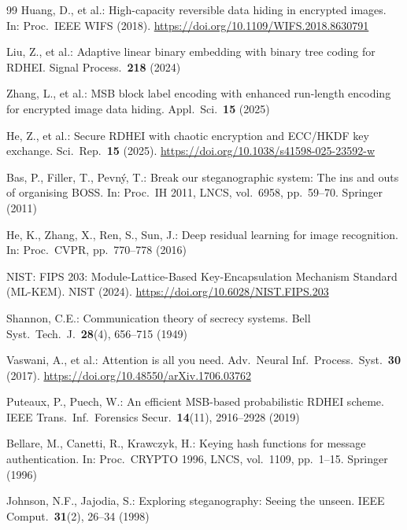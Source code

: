 \documentclass[runningheads]{llncs}
\begin{document}
\begin{thebibliography}{99}
Huang, D., et al.: High-capacity reversible data hiding in
encrypted images. In: Proc.\ IEEE WIFS (2018).
\url{https://doi.org/10.1109/WIFS.2018.8630791}

Liu, Z., et al.: Adaptive linear binary embedding with binary
tree coding for RDHEI. Signal Process.\ \textbf{218} (2024)

Zhang, L., et al.: MSB block label encoding with enhanced
run-length encoding for encrypted image data hiding.
Appl.\ Sci.\ \textbf{15} (2025)

He, Z., et al.: Secure RDHEI with chaotic encryption and
ECC/HKDF key exchange. Sci.\ Rep.\ \textbf{15} (2025).
\url{https://doi.org/10.1038/s41598-025-23592-w}

Bas, P., Filler, T., Pevn\'y, T.: Break our steganographic
system: The ins and outs of organising BOSS. In: Proc.\
IH 2011, LNCS, vol.\ 6958, pp.\ 59--70. Springer (2011)

He, K., Zhang, X., Ren, S., Sun, J.: Deep residual learning
for image recognition. In: Proc.\ CVPR, pp.\ 770--778 (2016)

NIST: FIPS 203: Module-Lattice-Based Key-Encapsulation
Mechanism Standard (ML-KEM). NIST (2024).
\url{https://doi.org/10.6028/NIST.FIPS.203}

Shannon, C.E.: Communication theory of secrecy systems.
Bell Syst.\ Tech.\ J.\ \textbf{28}(4), 656--715 (1949)

Vaswani, A., et al.: Attention is all you need.
Adv.\ Neural Inf.\ Process.\ Syst.\ \textbf{30} (2017).
\url{https://doi.org/10.48550/arXiv.1706.03762}

Puteaux, P., Puech, W.: An efficient MSB-based probabilistic
RDHEI scheme. IEEE Trans.\ Inf.\ Forensics Secur.\
\textbf{14}(11), 2916--2928 (2019)

Bellare, M., Canetti, R., Krawczyk, H.: Keying hash functions
for message authentication. In: Proc.\ CRYPTO 1996, LNCS,
vol.\ 1109, pp.\ 1--15. Springer (1996)

Johnson, N.F., Jajodia, S.: Exploring steganography: Seeing
the unseen. IEEE Comput.\ \textbf{31}(2), 26--34 (1998)

\end{thebibliography}
\end{document}

